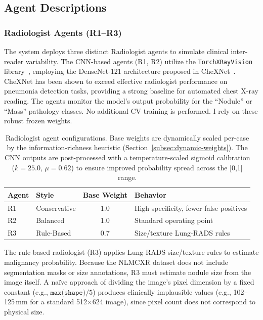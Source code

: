 \documentclass[12pt]{article}
\begin{document}
\subsection{Agent Descriptions}
\label{subsec:agents}

\subsubsection{Radiologist Agents (R1--R3)}
\label{subsubsec:radiologists}

The system deploys three distinct Radiologist agents to simulate clinical inter-reader variability. The CNN-based agents (R1, R2) utilize the \texttt{TorchXRayVision} library~\cite{cohen2022torchxrayvision}, employing the DenseNet-121 architecture proposed in CheXNet~\cite{rajpurkar2017chexnet}. CheXNet has been shown to exceed effective radiologist performance on pneumonia detection tasks, providing a strong baseline for automated chest X-ray reading. The agents monitor the model's output probability for the ``Nodule'' or ``Mass'' pathology classes. No additional CV training is performed. I rely on these robust frozen weights.

\begin{table}[ht]
\centering
\begin{tabular}{llcl}
\toprule
\textbf{Agent} & \textbf{Style} & \textbf{Base Weight} & \textbf{Behavior} \\
\midrule
R1 & Conservative & 1.0 & High specificity, fewer false positives \\
R2 & Balanced     & 1.0 & Standard operating point \\
R3 & Rule-Based   & 0.7 & Size/texture Lung-RADS rules \\
\bottomrule
\end{tabular}
\caption{Radiologist agent configurations. Base weights are dynamically scaled per-case by the information-richness heuristic (Section~\ref{subsec:dynamic-weights}). The CNN outputs are post-processed with a temperature-scaled sigmoid calibration ($k=25.0$, $\mu=0.62$) to ensure improved probability spread across the [0,1] range.}
\label{tab:radiologists}
\end{table}

The rule-based radiologist (R3) applies Lung-RADS size/texture rules to estimate malignancy probability. Because the NLMCXR dataset does not include segmentation masks or size annotations, R3 must estimate nodule size from the image itself. A na\"ive approach of dividing the image's pixel dimension by a fixed constant (e.g., $\texttt{max(shape)}/5$) produces clinically implausible values (e.g., 102--125\,mm for a standard 512$\times$624 image), since pixel count does not correspond to physical size.
\end{document}
